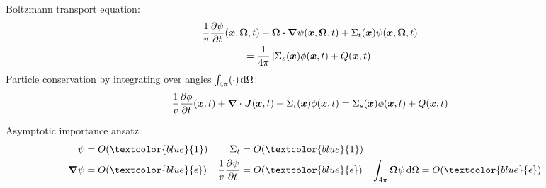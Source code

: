 \documentclass{beamer}
\newcommand{\epsiloncolor}[1]{\textcolor{blue}{#1}}
\begin{document}
\begin{frame}
  Boltzmann transport equation:
  \begin{multline} \label{eq:shortBoltzmannTd}
    \frac1v \frac{\partial \psi}{\partial t}(\bm{x}, \bm{\Omega}, t) + \bm{\Omega} \bm{\cdot} \bm{\nabla}
    \psi(\bm{x}, \bm{\Omega}, t) + \Sigma_t (\bm{x}) \psi(\bm{x},
    \bm{\Omega}, t) \\ =
    \frac{1}{4\pi} \left[ \Sigma_s (\bm{x}) \phi(\bm{x}, t) + Q(\bm{x}, t) \right]
  \end{multline}
  Particle conservation by integrating over angles $\int_{4\pi} (\cdot) \mathop{}\!\mathrm{d}
  \Omega$:
  \begin{equation} \label{eq:shortConservationTd}
    \frac1v\frac{\partial \phi}{\partial t}(\bm{x}, t) + \bm{\nabla} \bm{\cdot} \bm{J}(\bm{x}, t)
    + \Sigma_t (\bm{x}) \phi(\bm{x}, t) =
   \Sigma_s (\bm{x}) \phi(\bm{x}, t) + Q(\bm{x}, t)
  \end{equation}

  \begin{block}{Asymptotic importance ansatz}
    \begin{align*}
      \psi &= O(\epsiloncolor{1}) & \Sigma_t &= O(\epsiloncolor{1}) \\
      \del \psi &= O(\epsiloncolor{\epsilon}) &
      \frac1v\pder{\psi}{t} &= O(\epsiloncolor{\epsilon}) &
      \int_{4\pi} \vec{\Omega} \psi\ud \Omega &= O(\epsiloncolor{\epsilon})
    \end{align*}
  \end{block}
\end{frame}
\end{document}
